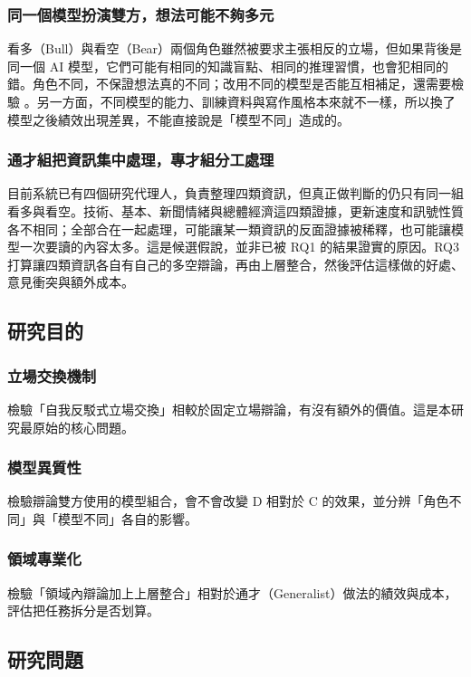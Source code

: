 \documentclass[12pt,a4paper]{article}
\numberwithin{table}{section}
\numberwithin{figure}{section}
\begin{document}
\subsubsection{同一個模型扮演雙方，想法可能不夠多元}
看多（Bull）與看空（Bear）兩個角色雖然被要求主張相反的立場，但如果背後是同一個 AI 模型，它們可能有相同的知識盲點、相同的推理習慣，也會犯相同的錯。角色不同，不保證想法真的不同；改用不同的模型是否能互相補足，還需要檢驗 \citep{zhang2025stop}。另一方面，不同模型的能力、訓練資料與寫作風格本來就不一樣，所以換了模型之後績效出現差異，不能直接說是「模型不同」造成的。

\subsubsection{通才組把資訊集中處理，專才組分工處理}
目前系統已有四個研究代理人，負責整理四類資訊，但真正做判斷的仍只有同一組看多與看空。技術、基本、新聞情緒與總體經濟這四類證據，更新速度和訊號性質各不相同；全部合在一起處理，可能讓某一類資訊的反面證據被稀釋，也可能讓模型一次要讀的內容太多。這是候選假說，並非已被 RQ1 的結果證實的原因。RQ3 打算讓四類資訊各自有自己的多空辯論，再由上層整合，然後評估這樣做的好處、意見衝突與額外成本。

\subsection{研究目的}

\subsubsection{立場交換機制}
檢驗「自我反駁式立場交換」相較於固定立場辯論，有沒有額外的價值。這是本研究最原始的核心問題。

\subsubsection{模型異質性}
檢驗辯論雙方使用的模型組合，會不會改變 D 相對於 C 的效果，並分辨「角色不同」與「模型不同」各自的影響。

\subsubsection{領域專業化}
檢驗「領域內辯論加上上層整合」相對於通才（Generalist）做法的績效與成本，評估把任務拆分是否划算。

\subsection{研究問題}
\end{document}
